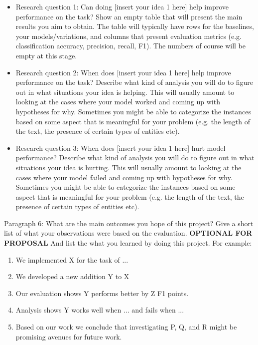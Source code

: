 \documentclass[11pt,a4paper]{article}
\begin{document}
\begin{itemize}
\item Research question 1: Can doing [insert your idea 1 here] help improve performance on the task? 
Show an empty table that will present the main results you aim to obtain. The table will typically have rows for the baselines, your models/variations, and columns that present evaluation metrics (e.g. classification accuracy, precision, recall, F1).
The numbers of course will be empty at this stage.

\item Research question 2: When does [insert your idea 1 here] help improve performance on the task? 
Describe what kind of analysis you will do to figure out in what situations your idea is helping. This will usually amount to looking at the cases where your model worked and coming up with hypotheses for why. Sometimes you might be able to categorize the instances based on some aspect that is meaningful for your problem (e.g. the length of the text, the presence of certain types of entities etc).

\item Research question 3: When does [insert your idea 1 here] hurt model performance?
Describe what kind of analysis you will do to figure out in what situations your idea is hurting. This will usually amount to looking at the cases where your model failed and coming up with hypotheses for why. Sometimes you might be able to categorize the instances based on some aspect that is meaningful for your problem (e.g. the length of the text, the presence of certain types of entities etc).


\end{itemize}


Paragraph 6: What are the main outcomes you hope of this project? Give a short list of what your observations were based on the evaluation.
\textbf{OPTIONAL FOR PROPOSAL}
And list the what you learned by doing this project. For example:
\begin{enumerate}
  
\item We implemented X for the task of ...
\item We developed a new addition Y to X
\item Our evaluation shows Y performs better by Z F1 points.
\item Analysis shows Y works well when ... and fails when ...
\item Based on our work we conclude that investigating P, Q, and R might be promising avenues for future work. 
\end{enumerate}

\newpage
\end{document}
